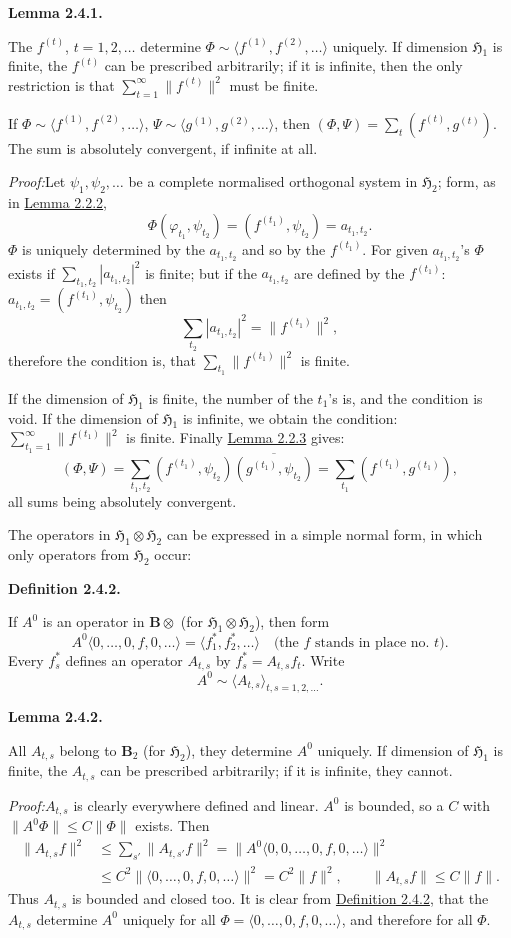 \documentclass[12pt,b5paper,twoside]{article}
\newcommand{\Hspace}{\mathfrak H}
\newcommand{\B}{\mathbf B}
\newcommand{\Definition}[1]{%
  \par\smallskip\noindent\phantomsection\label{def:#1}\textbf{Definition #1.}\enspace
}
\newcommand{\Lemma}[1]{%
  \par\smallskip\noindent\phantomsection\label{lem:#1}\textbf{Lemma #1.}\enspace
}
\newcommand{\Proof}{\par\noindent\textit{Proof:}\enspace}
\newcommand{\defref}[1]{\hyperref[def:#1]{Definition #1}}
\newcommand{\lemref}[1]{\hyperref[lem:#1]{Lemma #1}}
\begin{document}
\Lemma{2.4.1}
The $f^{(t)}$, $t=1,2,\ldots$ determine
$\Phi\sim\langle f^{(1)},f^{(2)},\ldots\rangle$ uniquely. If dimension
$\Hspace_1$ is finite, the $f^{(t)}$ can be prescribed arbitrarily; if it is
infinite, then the only restriction is that
$\sum_{t=1}^{\infty}\lVert f^{(t)}\rVert^2$ must be finite.

If $\Phi\sim\langle f^{(1)},f^{(2)},\ldots\rangle$,
$\Psi\sim\langle g^{(1)},g^{(2)},\ldots\rangle$, then
$(\Phi,\Psi)=\sum_t(f^{(t)},g^{(t)})$. The sum is absolutely convergent, if
infinite at all.

\Proof Let $\psi_1,\psi_2,\ldots$ be a complete normalised orthogonal system
in $\Hspace_2$; form, as in \lemref{2.2.2},
\[
 \Phi(\varphi_{t_1},\psi_{t_2})=(f^{(t_1)},\psi_{t_2})=a_{t_1,t_2}.
\]
$\Phi$ is uniquely determined by the $a_{t_1,t_2}$ and so by the
$f^{(t_1)}$. For given $a_{t_1,t_2}$'s $\Phi$ exists if
$\sum_{t_1,t_2}|a_{t_1,t_2}|^2$ is finite; but if the $a_{t_1,t_2}$ are
defined by the $f^{(t_1)}$: $a_{t_1,t_2}=(f^{(t_1)},\psi_{t_2})$ then
\[
 \sum_{t_2}|a_{t_1,t_2}|^2=\lVert f^{(t_1)}\rVert^2,
\]
therefore the condition is, that
$\sum_{t_1}\lVert f^{(t_1)}\rVert^2$ is finite.

If the dimension of $\Hspace_1$ is finite, the number of the $t_1$'s is, and
the condition is void. If the dimension of $\Hspace_1$ is infinite, we obtain
the condition: $\sum_{t_1=1}^{\infty}\lVert f^{(t_1)}\rVert^2$ is finite.
Finally \lemref{2.2.3} gives:
\[
 (\Phi,\Psi)
 =\sum_{t_1,t_2}(f^{(t_1)},\psi_{t_2})
       \overline{(g^{(t_1)},\psi_{t_2})}
 =\sum_{t_1}(f^{(t_1)},g^{(t_1)}),
\]
all sums being absolutely convergent.

The operators in $\Hspace_1\otimes\Hspace_2$ can be expressed in a simple
normal form, in which only operators from $\Hspace_2$ occur:

\Definition{2.4.2}
If $A^0$ is an operator in $\B\otimes$ (for
$\Hspace_1\otimes\Hspace_2$), then form
\[
 A^0\langle0,\ldots,0,f,0,\ldots\rangle
 =\langle f_1^*,f_2^*,\ldots\rangle
 \quad\text{(the $f$ stands in place no. $t$)}.
\]
Every $f_s^*$ defines an operator $A_{t,s}$ by
$f_s^*=A_{t,s}f_t$. Write
\[
 A^0\sim\langle A_{t,s}\rangle_{t,s=1,2,\ldots}.
\]

\Lemma{2.4.2}
All $A_{t,s}$ belong to $\B_2$ (for $\Hspace_2$), they determine $A^0$
uniquely. If dimension of $\Hspace_1$ is finite, the $A_{t,s}$ can be
prescribed arbitrarily; if it is infinite, they cannot.

\Proof $A_{t,s}$ is clearly everywhere defined and linear. $A^0$ is bounded,
so a $C$ with $\lVert A^0\Phi\rVert\leq C\lVert\Phi\rVert$ exists. Then
\begin{align*}
 \lVert A_{t,s}f\rVert^2
 &\leq\sum_{s'}\lVert A_{t,s'}f\rVert^2
  =\lVert A^0\langle0,0,\ldots,0,f,0,\ldots\rangle\rVert^2\\
 &\leq C^2\lVert\langle0,\ldots,0,f,0,\ldots\rangle\rVert^2
  =C^2\lVert f\rVert^2,
 \qquad \lVert A_{t,s}f\rVert\leq C\lVert f\rVert.
\end{align*}
Thus $A_{t,s}$ is bounded and closed too. It is clear from \defref{2.4.2},
that the $A_{t,s}$ determine $A^0$ uniquely for all
$\Phi=\langle0,\ldots,0,f,0,\ldots\rangle$, and therefore for all $\Phi$.
\end{document}
